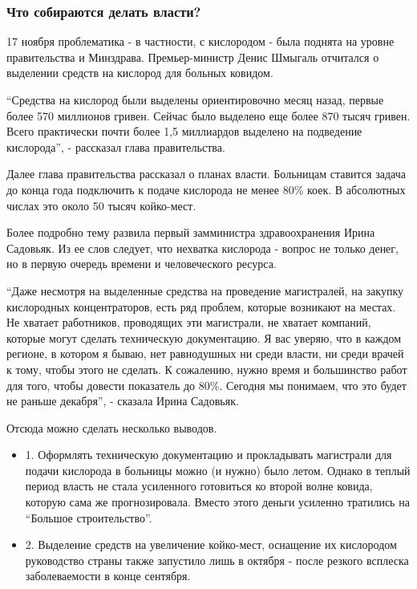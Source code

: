  
 
 
 
 

\subsubsection{Что собираются делать власти?}

17 ноября проблематика - в частности, с кислородом - была поднята на уровне правительства и Минздрава. Премьер-министр Денис Шмыгаль отчитался о выделении средств на кислород для больных ковидом.

\enquote{Средства на кислород были выделены ориентировочно месяц назад, первые более
570 миллионов гривен. Сейчас было выделено еще более 870 тысяч гривен. Всего
практически почти более 1,5 миллиардов выделено на подведение кислорода}, -
рассказал глава правительства.

Далее глава правительства рассказал о планах власти. Больницам ставится задача
до конца года подключить к подаче кислорода не менее 80\% коек. В абсолютных
числах это около 50 тысяч койко-мест. 

Более подробно тему развила первый замминистра здравоохранения Ирина Садовьяк.
Из ее слов следует, что нехватка кислорода - вопрос не только денег, но в
первую очередь времени и человеческого ресурса. 

\enquote{Даже несмотря на выделенные средства на проведение магистралей, на закупку
кислородных концентраторов, есть ряд проблем, которые возникают на местах. Не
хватает работников, проводящих эти магистрали, не хватает компаний, которые
могут сделать техническую документацию. Я вас уверяю, что в каждом регионе, в
котором я бываю, нет равнодушных ни среди власти, ни среди врачей к тому, чтобы
этого не сделать. К сожалению, нужно время и большинство работ для того, чтобы
довести показатель до 80\%. Сегодня мы понимаем, что это будет не раньше
декабря}, - сказала Ирина Садовьяк. 

Отсюда можно сделать несколько выводов. 

\begin{itemize}
\item 1. Оформлять техническую документацию и прокладывать магистрали для
				подачи кислорода в больницы можно (и нужно) было летом. Однако в теплый
				период власть не стала усиленного готовиться ко второй волне ковида,
				которую сама же прогнозировала. Вместо этого деньги усиленно тратились
				на \enquote{Большое строительство}. 

\item 2. Выделение средств на увеличение койко-мест, оснащение их кислородом
				руководство страны также запустило лишь в октября  - после резкого
				всплеска заболеваемости в конце сентября. 
\end{itemize}

